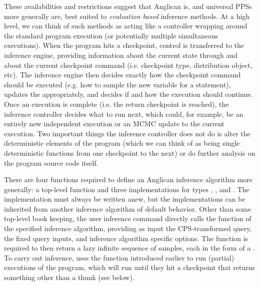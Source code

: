 These availabilities and restrictions suggest that Anglican is, and universal PPSs more generally are,
best suited to \emph{evaluation based} inference methods.  At a high level, we can think of such methods
as acting like a controller wrapping around the standard program
execution (or potentially multiple simultaneous executions).  When the program hits a checkpoint,
control is transferred to the inference engine, providing information about the current state through
\angstate and about the current checkpoint command (i.e. checkpoint type, distribution object, etc).
The inference engine then decides exactly how the checkpoint command should be executed (e.g. how to
sample the new variable for a \sample statement), updates the \angstate appropriately, and decides if
and how the execution should continue.  Once an execution is complete (i.e. the return checkpoint
is reached), the inference controller decides what to run next, which could, for example, be an entirely new independent
execution or an MCMC update to the current execution.  Two important things the inference controller
does not do is alter the deterministic elements of the program (which we can think of as being single
deterministic functions from one checkpoint to the next)
or do further analysis on the program source code itself.  

There are four functions required to define an Anglican inference algorithm more generally: a top-level 
\anginfer function and three \checkpoint implementations
for types , , and  .  The \anginfer
implementation must always be written anew, but the \checkpoint implementations can be inherited from
another inference algorithm of default behavior.  Other than some top-level book keeping, the user
inference command \doquery directly calls the \anginfer function of the specified inference algorithm, providing
as input the CPS-transformed query, the fixed query inputs, and inference algorithm specific options.
The \anginfer function is required to then return a lazy infinite sequence of samples, each in the form of
a \angstate.  To carry out inference, \anginfer uses the  function introduced earlier
to run (partial) executions of the program, which will run until they hit a checkpoint that returns something
other than a thunk (see below).  


